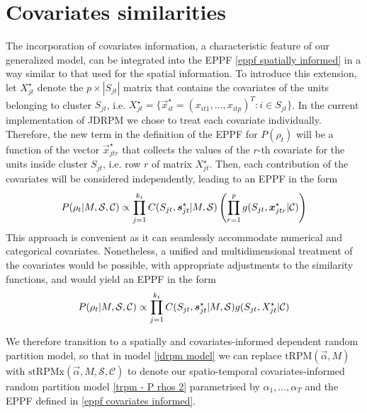 \documentclass[12pt,	%
	a4paper,		%
	twoside,		%
	openright,		%
	titlepage,%
	]{book}
\theoremstyle{definition}
\begin{document}
\section{Covariates similarities}
\label{Covariates similarity analysis}

The incorporation of covariates information, a characteristic feature of our generalized model, can be integrated into the EPPF \eqref{eppf spatially informed} in a way similar to that used for the spatial information. To introduce this extension, let $X_{jt}^\star$ denote the $p \times |S_{jt}|$ matrix that contains the covariates of the units belonging to cluster $S_{jt}$, i.e. $X_{jt}^\star = \{ \vec{x}_{it}^\star = (x_{it1}, \ldots, x_{itp})^T : i \in S_{jt} \}$. In the current implementation of JDRPM we chose to treat each covariate individually. Therefore, the new term in the definition of the EPPF for $P(\rho_t)$ will be a function of the vector $\vec{x}_{jtr}^\star$ that collects the values of the $r$-th covariate for the units inside cluster $S_{jt}$, i.e. row $r$ of matrix $X_{jt}^\star$. Then, each contribution of the covariates will be considered independently, leading to an EPPF in the form
\begin{equation}
P(\rho_t|M,\mathcal{S},\mathcal{C}) \propto \prod_{j=1}^{k_t} C(S_{jt},\boldsymbol{s}_{jt}^\star|M,\mathcal{S}) \left( \prod_{r=1}^p g(S_{jt},\boldsymbol{x}_{jtr}^\star|\mathcal{C}) \right)
    \label{eppf covariates informed}
\end{equation}
This approach is convenient as it can seamlessly accommodate numerical and categorical covariates. Nonetheless, a unified and multidimensional treatment of the covariates would be possible, with appropriate adjustments to the similarity functions, and would yield an EPPF in the form
\begin{equation}
P(\rho_t|M,\mathcal{S},\mathcal{C}) \propto \prod_{j=1}^{k_t}C(S_{jt},\boldsymbol{s}_{jt}^\star|M,\mathcal{S}) g(S_{jt},X_{jt}^\star|\mathcal{C})
    \label{eppf covariates informed NON NOSTRO}
\end{equation}

We therefore transition to a spatially and covariates-informed dependent random partition model, so that in model \eqref{jdrpm model} we can replace $\text{tRPM$(\vec{\alpha},M)$}$ with $\text{stRPMx$(\vec{\alpha},M,\mathcal{S},\mathcal{C})$}$ to denote our spatio-temporal covariates-informed random partition model \eqref{trpm - P rhos 2} parametrised by $\alpha_1,\ldots,\alpha_T$ and the EPPF defined in \eqref{eppf covariates informed}.
\end{document}
